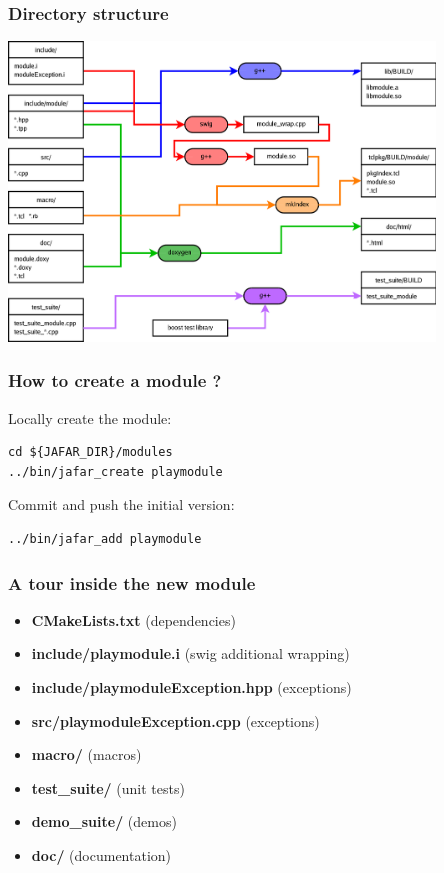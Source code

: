 \documentclass[compress]{beamer}
\begin{document}
\begin{frame}
  \frametitle{Directory structure}
  \begin{center}
    \includegraphics[width=0.85\textwidth]{../graphics/jafar_module.png}
  \end{center}
\end{frame}

\begin{frame}[fragile]
  \frametitle{How to create a module ?}
  Locally create the module:
  \begin{lstlisting}
cd ${JAFAR_DIR}/modules
../bin/jafar_create playmodule
  \end{lstlisting}
  Commit and push the initial version:
  \begin{lstlisting}
../bin/jafar_add playmodule
  \end{lstlisting}
\end{frame}

\begin{frame}
  \frametitle{A tour inside the new module}
  \begin{itemize}
   \item<1-> \textbf{CMakeLists.txt} (dependencies)
   \item<2-> \textbf{include/playmodule.i} (swig additional wrapping)
   \item<3-> \textbf{include/playmoduleException.hpp} (exceptions)
   \item<4-> \textbf{src/playmoduleException.cpp} (exceptions)
   \item<5-> \textbf{macro/} (macros)
   \item<6-> \textbf{test\_suite/} (unit tests)
   \item<7-> \textbf{demo\_suite/} (demos)
   \item<8-> \textbf{doc/} (documentation)
  \end{itemize}
\end{frame}
\end{document}
